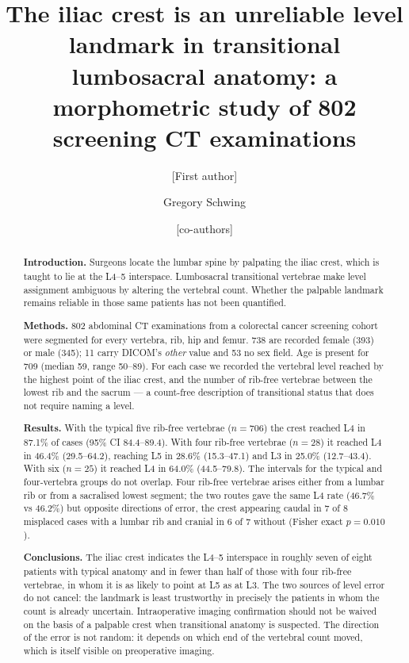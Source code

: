 \documentclass[11pt,a4paper]{article}
\title{The iliac crest is an unreliable level landmark in transitional lumbosacral
       anatomy: a morphometric study of 802 screening CT examinations}
\author[1]{[First author]}
\author[1]{Gregory Schwing}
\author[1]{[co-authors]}
\affil[1]{Department of Surgery, Detroit Medical Center / Wayne State University, Detroit, Michigan, USA}
\date{}
\begin{document}
\maketitle

\begin{abstract}
\noindent\textbf{Introduction.} Surgeons locate the lumbar spine by palpating the iliac
crest, which is taught to lie at the L4--5 interspace. Lumbosacral transitional vertebrae
make level assignment ambiguous by altering the vertebral count. Whether the palpable
landmark remains reliable in those same patients has not been quantified.

\noindent\textbf{Methods.} 802 abdominal CT examinations from a colorectal cancer
screening cohort were segmented for every vertebra, rib, hip and femur. 738 are recorded female
(393) or male (345); 11 carry DICOM's \emph{other} value and 53 no sex field. Age is
present for 709 (median 59, range 50--89). For each case we recorded the vertebral level reached
by the highest point of the iliac crest, and the number of rib-free vertebrae between the
lowest rib and the sacrum --- a count-free description of transitional status that does
not require naming a level.

\noindent\textbf{Results.} With the typical five rib-free vertebrae ($n=706$) the crest
reached L4 in 87.1\% of cases (95\% CI 84.4--89.4). With four rib-free vertebrae ($n=28$)
it reached L4 in 46.4\% (29.5--64.2), reaching L5 in 28.6\% (15.3--47.1) and L3 in 25.0\%
(12.7--43.4). With six ($n=25$) it reached L4 in 64.0\% (44.5--79.8). The intervals for
the typical and four-vertebra groups do not overlap. Four rib-free vertebrae arises
either from a lumbar rib or from a sacralised lowest segment; the two routes gave the
same L4 rate (46.7\% vs 46.2\%) but opposite directions of error, the crest appearing
caudal in 7 of 8 misplaced cases with a lumbar rib and cranial in 6 of 7 without
(Fisher exact $p = 0.010$).

\noindent\textbf{Conclusions.} The iliac crest indicates the L4--5 interspace in roughly
seven of eight patients with typical anatomy and in fewer than half of those with four
rib-free vertebrae, in whom it is as likely to point at L5 as at L3. The two sources of
level error do not cancel: the landmark is least trustworthy in precisely the patients in
whom the count is already uncertain. Intraoperative imaging confirmation should not be
waived on the basis of a palpable crest when transitional anatomy is suspected. The
direction of the error is not random: it depends on which end of the vertebral count
moved, which is itself visible on preoperative imaging.
\end{abstract}
\end{document}
